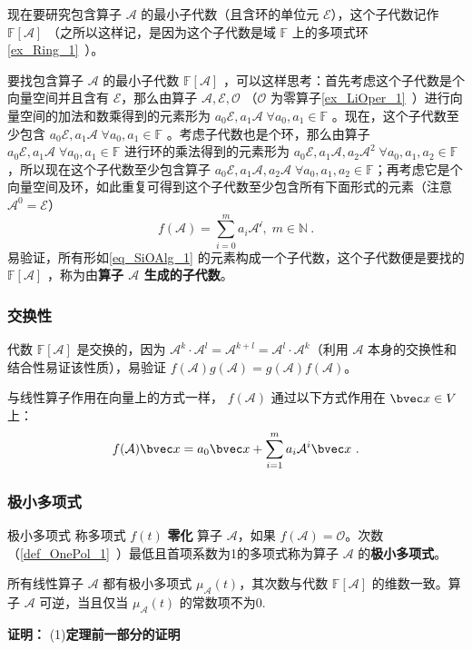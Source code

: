 现在要研究包含算子 $\mathcal{A}$ 的最小子代数（且含环的单位元 $\mathcal{E}$），这个子代数记作 $\mathbb{F}[\mathcal A]$ （之所以这样记，是因为这个子代数是域 $\mathbb{F}$ 上的多项式环\autoref{ex_Ring_1}~）。

要找包含算子 $\mathcal{A}$ 的最小子代数 $\mathbb{F}[\mathcal A]$ ，可以这样思考：首先考虑这个子代数是个向量空间并且含有 $\mathcal{E}$，那么由算子 $\mathcal{A,E,O}$ （$\mathcal{O}$ 为零算子\autoref{ex_LiOper_1}~）进行向量空间的加法和数乘得到的元素形为 $a_0\mathcal{E},a_1\mathcal{A}\;\forall a_0,a_1\in\mathbb{F}$ 。现在，这个子代数至少包含 $a_0\mathcal{E},a_1\mathcal{A}\;\forall a_0,a_1\in\mathbb{F}$ 。考虑子代数也是个环，那么由算子 $a_0\mathcal{E},a_1\mathcal{A}\;\forall a_0,a_1\in\mathbb{F}$ 进行环的乘法得到的元素形为 $a_0\mathcal{E},a_1\mathcal{A},a_2\mathcal{A}^2\;\forall a_0,a_1,a_2\in\mathbb{F}$，所以现在这个子代数至少包含算子 $a_0\mathcal{E},a_1\mathcal{A},a_2\mathcal{A}\;\forall a_0,a_1,a_2\in\mathbb{F}$；再考虑它是个向量空间及环，如此重复可得到这个子代数至少包含所有下面形式的元素（注意 $\mathcal{A}^0=\mathcal{E}$）
\begin{equation}\label{eq_SiOAlg_1}
f(\mathcal{A})=\sum_{i=0}^ma_i\mathcal{A^i},\;m\in\mathbb{N}~.
\end{equation}
易验证，所有形如\autoref{eq_SiOAlg_1} 的元素构成一个子代数，这个子代数便是要找的 $\mathbb{F}[\mathcal A]$ ，称为由\textbf{算子 $\mathcal{A}$ 生成的子代数}。

\subsubsection{交换性}
代数 $\mathbb{F}[\mathcal A]$ 是交换的，因为 $\mathcal A^{k}\cdot \mathcal{A}^l=\mathcal{A}^{k+l}=\mathcal A^{l}\cdot \mathcal{A}^k$（利用 $\mathcal{A}$ 本身的交换性和结合性易证该性质），易验证 $f(\mathcal{A})g(\mathcal{A})=g(\mathcal{A})f(\mathcal{A})$。

与线性算子作用在向量上的方式一样， $f(\mathcal{A})$ 通过以下方式作用在 $\bvec x\in V$ 上：
\begin{equation}
f(\mathcal{A})\bvec x=a_0\bvec x+\sum_{i=1}^m a_i\mathcal{A}^i\bvec x~.
\end{equation}

\subsubsection{极小多项式}
\begin{definition}{极小多项式}
称多项式 $f(t)$ \textbf{零化} 算子 $\mathcal{A}$，如果 $f(\mathcal{A})=\mathcal O$。次数（\autoref{def_OnePol_1}~）最低且首项系数为1的多项式称为算子 $\mathcal{A}$ 的\textbf{极小多项式}。
\end{definition}
\begin{theorem}{}
所有线性算子 $\mathcal{A}$ 都有极小多项式 $\mu_\mathcal{A}(t)$，其次数与代数 $\mathbb{F}[\mathcal{A}]$ 的维数一致。算子 $\mathcal{A}$ 可逆，当且仅当 $\mu_\mathcal{A}(t)$ 的常数项不为0.
\end{theorem}
\textbf{证明：}
(1)\textbf{定理前一部分的证明}


